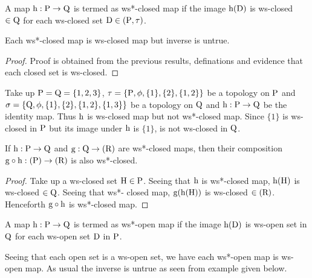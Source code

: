 \begin{dfn}\label{defi4.2.42}
A map $\mathrm{h}: \mathrm{P}\to \mathrm{Q}$ is termed as ws*-closed map if the image $\mathrm{h}(\mathrm{D})$ is ws-closed $\in \mathrm{Q}$ for each ws-closed set $\mathrm{D} \in(\mathrm{P}, \tau)$.
\end{dfn}

\begin{thm}\label{thm4.2.43}
Each ws*-closed map is ws-closed map but inverse is untrue.
\end{thm}

\begin{proof}
Proof is obtained from the previous results, definations and evidence that each closed set is ws-closed.
\end{proof}

\begin{exm}\label{exam4.2.44}
Take up $\mathrm{P} = \mathrm{Q} = \{1, 2, 3\}$, $\tau = \{\mathrm{P}, \phi, \{1\}, \{2\}, \{1, 2\}\}$ be a topology on $\mathrm{P}$ and $\sigma = \{\mathrm{Q}, \phi, \{1\}, \{2\},\{1, 2\},\{1,3\}\}$ be a topology on $\mathrm{Q}$ and $\mathrm{h}: \mathrm{P} \to \mathrm{Q}$ be the identity map. Thus $\mathrm{h}$ is ws-closed map but not ws*-closed map. Since $\{1\}$ is ws-closed in $\mathrm{P}$ but its image under $\mathrm{h}$ is $\{1\}$, is not ws-closed in $\mathrm{Q}$.
\end{exm}

\begin{thm}\label{thm4.2.45}
If $\mathrm{h}: \mathrm{P} \to \mathrm{Q}$ and $\mathrm{g}: \mathrm{Q}\to (\mathrm{R})$ are ws*-closed maps, then their composition $\mathrm{g} \circ \mathrm{h}: (\mathrm{P}) \to (\mathrm{R})$ is also ws*-closed.
\end{thm}

\begin{proof}
Take up a ws-closed set $\mathrm{H} \in \mathrm{P}$. Seeing that $\mathrm{h}$ is ws*-closed map, $\mathrm{h} (\mathrm{H})$ is ws-closed $\in \mathrm{Q}$. Seeing that ws*- closed map, $\mathrm{g} (\mathrm{h} (\mathrm{H}))$ is ws-closed $\in (\mathrm{R})$. Henceforth $\mathrm{g} \circ \mathrm{h}$ is ws*-closed map.
\end{proof}

\begin{dfn}\label{defi4.2.46}
A map $\mathrm{h}: \mathrm{P} \to \mathrm{Q}$ is termed as ws*-open map if the image $\mathrm{h} (\mathrm{D})$ is ws-open set in $\mathrm{Q}$ for each ws-open set $\mathrm{D}$ in $\mathrm{P}$.
\end{dfn}

\begin{rem}\label{rem4.2.47}
Seeing that each open set is a ws-open set, we have each ws*-open map is ws-open map. As usual the inverse is untrue as seen from example given below.
\end{rem}

